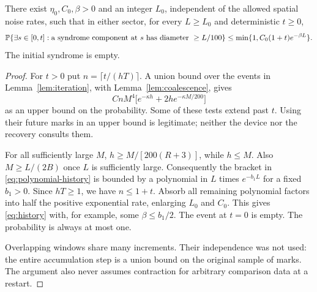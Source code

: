 \begin{proposition}\label{prop:history}
There exist \(\eta_0,C_0,\beta>0\) and an integer \(L_0\), independent
of the allowed spatial noise rates, such that in either sector,
for every \(L\ge L_0\) and deterministic \(t\ge0\),
\begin{equation}\label{eq:history}
 \mathbb P\{\exists s\in[0,t]:
       \text{a syndrome component at }s
                   \text{ has diameter }\ge L/100\}
 \le \min\{1,C_0(1+t)e^{-\beta L}\}.
\end{equation}
The initial syndrome is empty.
\end{proposition}
\begin{proof}
For \(t>0\) put \(n=\lceil t/(hT)\rceil\). A union bound over the
events in Lemma~\ref{lem:iteration}, with
Lemma~\ref{lem:coalescence}, gives
\begin{equation}\label{eq:polynomial-history}
 CnM^4\bigl[e^{-\kappa h}
                  +2h e^{-\kappa M/200}\bigr]
\end{equation}
as an upper bound on the probability. Some of these tests extend
past \(t\). Using their future marks in an upper bound is legitimate;
neither the device nor the recovery consults them.

For all sufficiently large \(M\),
\(h\ge M/[200(R+3)]\), while \(h\le M\).
Also \(M\ge L/(2B)\) once \(L\) is sufficiently large.
Consequently the bracket in
\eqref{eq:polynomial-history} is bounded by a polynomial in \(L\)
times \(e^{-b_1L}\) for a fixed \(b_1>0\). Since
\(hT\ge1\), we have \(n\le1+t\). Absorb all remaining polynomial
factors into half the positive exponential rate, enlarging \(L_0\)
and \(C_0\). This gives \eqref{eq:history} with, for example, some
\(\beta\le b_1/2\). The event at \(t=0\) is empty.
The probability is always at most one.

Overlapping windows share many increments. Their independence was
not used: the entire accumulation step is a union bound on the
original sample of marks. The argument also never assumes
contraction for arbitrary comparison data at a restart.
\end{proof}
